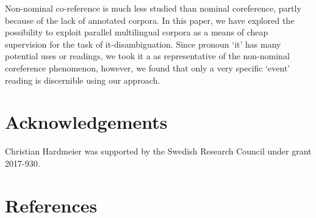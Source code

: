 \documentclass[10pt, a4paper]{article}
\begin{document}
Non-nominal co-reference is much less studied than nominal coreference, partly
because of the lack of annotated corpora. In this paper, we have explored the
possibility to exploit parallel multilingual corpora as a means of cheap
supervision for the task of it-disambiguation. Since pronoun `it' has many
potential uses or readings, we took it a as representative of the non-nominal
coreference phenomenon, however, we found that only a very specific `event' reading 
is discernible using our approach. 

%
%
%
\section{Acknowledgements}
Christian Hardmeier was supported by the Swedish Research Council under grant 2017-930.
%
%
\section{References}

 


\end{document}

